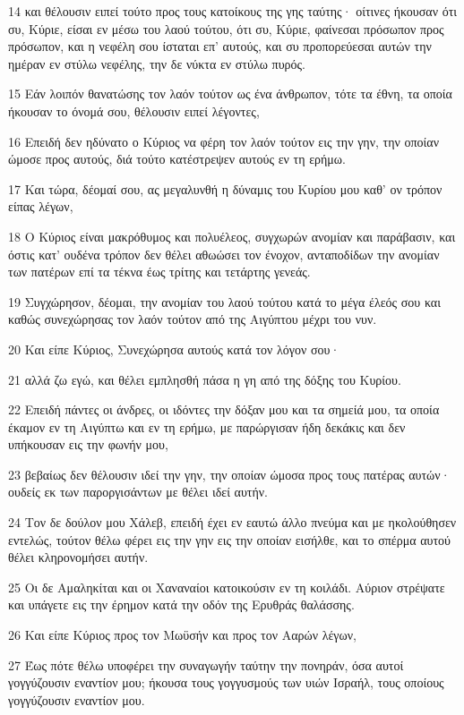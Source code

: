 \par 14 και θέλουσιν ειπεί τούτο προς τους κατοίκους της γης ταύτης· οίτινες ήκουσαν ότι συ, Κύριε, είσαι εν μέσω του λαού τούτου, ότι συ, Κύριε, φαίνεσαι πρόσωπον προς πρόσωπον, και η νεφέλη σου ίσταται επ' αυτούς, και συ προπορεύεσαι αυτών την ημέραν εν στύλω νεφέλης, την δε νύκτα εν στύλω πυρός.
\par 15 Εάν λοιπόν θανατώσης τον λαόν τούτον ως ένα άνθρωπον, τότε τα έθνη, τα οποία ήκουσαν το όνομά σου, θέλουσιν ειπεί λέγοντες,
\par 16 Επειδή δεν ηδύνατο ο Κύριος να φέρη τον λαόν τούτον εις την γην, την οποίαν ώμοσε προς αυτούς, διά τούτο κατέστρεψεν αυτούς εν τη ερήμω.
\par 17 Και τώρα, δέομαί σου, ας μεγαλυνθή η δύναμις του Κυρίου μου καθ' ον τρόπον είπας λέγων,
\par 18 Ο Κύριος είναι μακρόθυμος και πολυέλεος, συγχωρών ανομίαν και παράβασιν, και όστις κατ' ουδένα τρόπον δεν θέλει αθωώσει τον ένοχον, ανταποδίδων την ανομίαν των πατέρων επί τα τέκνα έως τρίτης και τετάρτης γενεάς.
\par 19 Συγχώρησον, δέομαι, την ανομίαν του λαού τούτου κατά το μέγα έλεός σου και καθώς συνεχώρησας τον λαόν τούτον από της Αιγύπτου μέχρι του νυν.
\par 20 Και είπε Κύριος, Συνεχώρησα αυτούς κατά τον λόγον σου·
\par 21 αλλά ζω εγώ, και θέλει εμπλησθή πάσα η γη από της δόξης του Κυρίου.
\par 22 Επειδή πάντες οι άνδρες, οι ιδόντες την δόξαν μου και τα σημείά μου, τα οποία έκαμον εν τη Αιγύπτω και εν τη ερήμω, με παρώργισαν ήδη δεκάκις και δεν υπήκουσαν εις την φωνήν μου,
\par 23 βεβαίως δεν θέλουσιν ιδεί την γην, την οποίαν ώμοσα προς τους πατέρας αυτών· ουδείς εκ των παροργισάντων με θέλει ιδεί αυτήν.
\par 24 Τον δε δούλον μου Χάλεβ, επειδή έχει εν εαυτώ άλλο πνεύμα και με ηκολούθησεν εντελώς, τούτον θέλω φέρει εις την γην εις την οποίαν εισήλθε, και το σπέρμα αυτού θέλει κληρονομήσει αυτήν.
\par 25 Οι δε Αμαληκίται και οι Χαναναίοι κατοικούσιν εν τη κοιλάδι. Αύριον στρέψατε και υπάγετε εις την έρημον κατά την οδόν της Ερυθράς θαλάσσης.
\par 26 Και είπε Κύριος προς τον Μωϋσήν και προς τον Ααρών λέγων,
\par 27 Έως πότε θέλω υποφέρει την συναγωγήν ταύτην την πονηράν, όσα αυτοί γογγύζουσιν εναντίον μου; ήκουσα τους γογγυσμούς των υιών Ισραήλ, τους οποίους γογγύζουσιν εναντίον μου.
